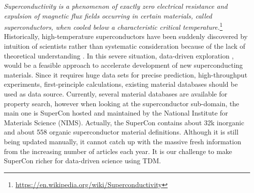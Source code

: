 \documentclass{article}[a4]
\begin{document}
\textit{Superconductivity is a phenomenon of exactly zero electrical resistance and expulsion of magnetic flux fields occurring in certain materials, called superconductors, when cooled below a characteristic critical temperature.}\footnote{\url{https://en.wikipedia.org/wiki/Superconductivity}}
Historically, high-temperature superconductors have been suddenly discovered by intuition of scientists rather than systematic consideration because of the lack of theoretical understanding \cite{klintenberg2013possible} \cite{DBLP:journals/corr/abs-1812-01995}. In this severe situation,  data-driven exploration \cite{doi:10.1080/14686996.2018.1548885}, \cite{HAMIDIEH2018346} \cite{PhysRevMaterials.2.024802} \cite{doi:10.1021/cm503507h} would be a feasible approach to accelerate development of new superconducting materials. Since it requires huge data sets for precise prediction, high-throughput experiments, first-principle calculations, existing material databases should be used as data source. Currently, several material databases are available for property search, however when looking at the superconductor sub-domain, the main one is SuperCon\cite{SuperCon} hosted and maintained by the National Institute for Materials Science (NIMS). Actually, the SuperCon contains about 32k inorganic and about 558 organic superconductor material definitions. Although it is still being updated manually, it cannot catch up with the massive fresh information from the increasing number of articles each year. It is our challenge to make SuperCon richer for data-driven science using TDM.


\end{document}
